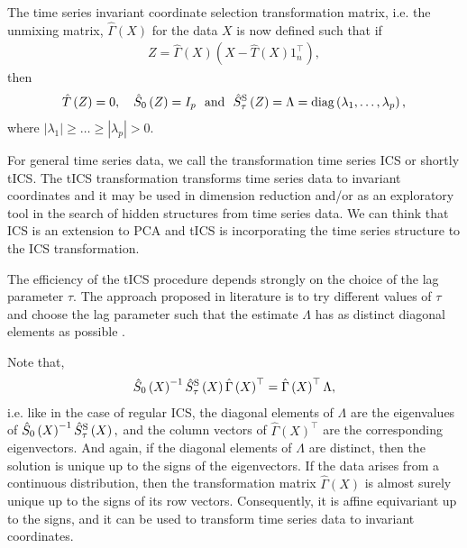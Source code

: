 \documentclass{llncs}
\begin{document}
 The time series invariant coordinate selection transformation matrix, i.e. the unmixing matrix, $\hat{\Gamma}\left(X\right)$ for the data $X$ is now defined such that if 
\begin{align*}
Z= \hat{\Gamma}\left(X\right)\left(X-\hat{T}\left(X\right)1_n^\top\right),
\end{align*}
then
\begin{eqnarray*}
\hat{T}\left(Z\right)=0,\text{ }  \text{ }  \  \hat{S}_0\left(Z\right)=I_p  \text{ } \text{ and } \text{ }  \hat{S}^\textnormal{S}_{\tau}\left(Z\right)=\Lambda=\text{diag}\left(\lambda_1, \ldots, \lambda_p\right),
\end{eqnarray*}
where  $\left|\lambda_1\right|\geq \ldots \geq \left|\lambda_p\right| > 0$.



For general time series data, we call the transformation time series ICS or shortly tICS. The tICS transformation transforms time series data to invariant coordinates and it may be used in dimension reduction and/or as an exploratory tool in the search of hidden structures from time series data. We can think that ICS is an extension to PCA and tICS is incorporating the time series structure to the ICS transformation.

The efficiency of the tICS procedure depends strongly on the choice of the lag parameter $\tau$. The approach proposed in literature is to try different values of $\tau$ and  choose the lag parameter such that the estimate $\Lambda$ has as distinct diagonal elements as possible  \cite{amari2002}.


Note that,
\begin{align*}
\hat{S}_0\left(X\right)^{-1}\hat{S}_{\tau}^\textnormal{S}\left(X\right) \hat{\Gamma}\left(X\right)^\top =\hat{\Gamma}\left(X\right)^\top\Lambda,
\end{align*}
i.e. like in the case of regular ICS, the diagonal elements of $\Lambda$ are the eigenvalues of $\hat{S}_0\left(X\right)^{-1}\hat{S}^\textnormal{S}_{\tau}\left(X\right),$ and the column vectors of $\hat{\Gamma}\left(X\right)^\top$ are the corresponding eigenvectors. And again, if the diagonal elements of $\Lambda$ are distinct, then the solution is unique up to the signs of the eigenvectors.
If the data arises from a continuous distribution, then the transformation matrix $\hat{\Gamma}\left(X\right)$ is almost surely unique up to the signs of its row vectors. Consequently, it is affine equivariant up to the signs, and it can be used to transform time series data to invariant coordinates.
\end{document}
